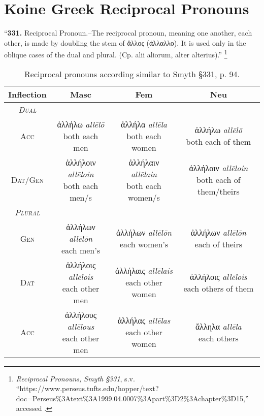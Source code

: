\documentclass[10pt]{memoir}
\newcommand{\tsc}[1]{\textsc{#1}}
\newcommand{\grc}[1]{\fontspec{Inter}#1}
\newcommand{\trc}[1]{\textit{\fontspec{Tinos}#1}}
\newcommand{\linkfoot}[3]{\footnote{\emph{#1}, s.v. ``{#2},'' accessed \printdate{#3}.}}
\begin{document}
    \section*{Koine Greek Reciprocal Pronouns}

    ``\textbf{331.} Reciprocal Pronoun.--The reciprocal pronoun, meaning one another, each other, is made
    by doubling the stem of \grc{ἄλλος} (\grc{ἀλλαλλο}). \fontspec{} It is used only in the oblique cases of
    the dual and plural. (Cp. alii aliorum, alter alterius).''
    \linkfoot{Reciprocal Pronouns, Smyth §331}{https://www.perseus.tufts.edu/hopper/text?doc=Perseus\%3Atext\%3A1999.04.0007\%3Apart\%3D2\%3Achapter\%3D15}{2025-10-20}

    \begin{table}[H]
        \begin{tabular}{c|ccc}
            \textbf{Inflection} & \textbf{Masc} & \textbf{Fem} & \textbf{Neu} \\
            \hline
            \emph{\tsc{Dual}} \\
            \tsc{Acc} & \makecell{\grc{ἀλλήλω} \trc{allēlō} \\ \small both each men} & \makecell{\grc{ἀλλήλα} \trc{allēla} \\ \small both each women} & \makecell{\grc{ἀλλήλω} \trc{allēlō} \\ \small both each of them} \\
            \tsc{Dat/Gen} & \makecell{\grc{ἀλλήλοιν} \trc{allēloin} \\ \small both each men/s} & \makecell{\grc{ἀλλήλαιν} \trc{allēlain} \\ \small both each women/s} & \makecell{\grc{ἀλλήλοιν} \trc{allēloin} \\ \small both each of them/theirs} \\
            \hline
            \emph{\tsc{Plural}} \\
            \tsc{Gen} & \makecell{\grc{ἀλλήλων} \trc{allēlōn} \\ \small each men's} & \makecell{\grc{ἀλλήλων} \trc{allēlōn} \\ \small each women's} & \makecell{\grc{ἀλλήλων} \trc{allēlōn} \\ \small each of theirs} \\
            \tsc{Dat} & \makecell{\grc{ἀλλήλοις} \trc{allēlois} \\ \small each other men} & \makecell{\grc{ἀλλήλαις} \trc{allēlais}\\ \small each other women} & \makecell{\grc{ἀλλήλοις} \trc{allēlois} \\ \small each others of them } \\
            \tsc{Acc} & \makecell{\grc{ἀλλήλους} \trc{allēlous} \\ \small each other men} & \makecell{\grc{ἀλλήλας} \trc{allēlas} \\ \small each other women} & \makecell{\grc{ἄλληλα} \trc{allēla} \\ \small each others} \\
        \end{tabular}
        \caption{Reciprocal pronouns according similar to Smyth §331, p. 94.}
    \end{table}
\end{document}

